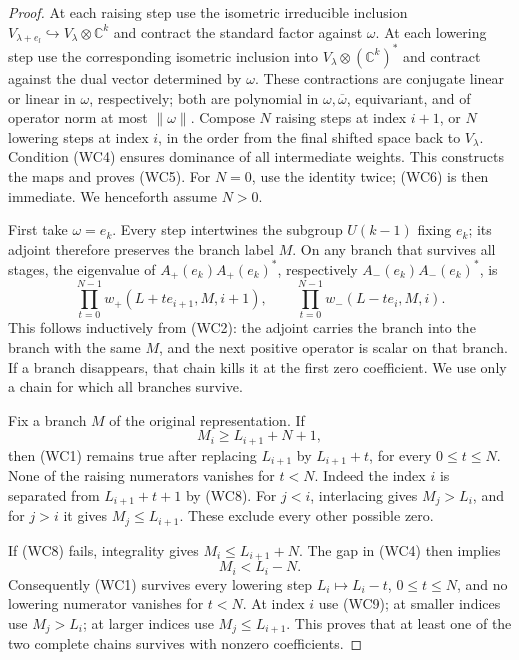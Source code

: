 \begin{proof}
At each raising step use the isometric irreducible inclusion
\(V_{\lambda+e_l}\hookrightarrow V_\lambda\otimes\mathbb C^k\)
and contract the standard factor against \(\omega\). At each
lowering step use the corresponding isometric inclusion into
\(V_\lambda\otimes(\mathbb C^k)^*\) and contract against the
dual vector determined by \(\omega\). These contractions are
conjugate linear or linear in \(\omega\), respectively; both are
polynomial in \(\omega,\overline\omega\), equivariant, and of
operator norm at most \(\|\omega\|\).
Compose \(N\) raising steps at index \(i+1\), or \(N\) lowering
steps at index \(i\), in the order from the final shifted space
back to \(V_\lambda\). Condition (WC4) ensures dominance of all
intermediate weights. This constructs the maps and proves (WC5).
For \(N=0\), use the identity twice; (WC6) is then immediate.
We henceforth assume \(N>0\).

First take \(\omega=e_k\). Every step intertwines the subgroup
\(U(k-1)\) fixing \(e_k\); its adjoint therefore preserves the
branch label \(M\). On any branch that survives all stages,
the eigenvalue of \(A_+(e_k)A_+(e_k)^*\), respectively
\(A_-(e_k)A_-(e_k)^*\), is
\[
 \prod_{t=0}^{N-1}w_+(L+te_{i+1},M,i+1),\qquad
 \prod_{t=0}^{N-1}w_-(L-te_i,M,i).                       \tag{WC7}
\]
This follows inductively from (WC2): the adjoint carries the
branch into the branch with the same \(M\), and the next positive
operator is scalar on that branch. If a branch disappears, that
chain kills it at the first zero coefficient. We use only a chain
for which all branches survive.

Fix a branch \(M\) of the original representation. If
\[
                        M_i\ge L_{i+1}+N+1,             \tag{WC8}
\]
then (WC1) remains true after replacing \(L_{i+1}\) by
\(L_{i+1}+t\), for every \(0\le t\le N\).
None of the raising numerators vanishes for \(t<N\).
Indeed the index \(i\) is separated from
\(L_{i+1}+t+1\) by (WC8). For \(j<i\), interlacing gives
\(M_j>L_i\), and for \(j>i\) it gives \(M_j\le L_{i+1}\).
These exclude every other possible zero.

If (WC8) fails, integrality gives
\(M_i\le L_{i+1}+N\). The gap in (WC4) then implies
\[
                       M_i<L_i-N .                     \tag{WC9}
\]
Consequently (WC1) survives every lowering step
\(L_i\mapsto L_i-t\), \(0\le t\le N\), and no lowering
numerator vanishes for \(t<N\). At index \(i\) use (WC9);
at smaller indices use \(M_j>L_i\); at larger indices use
\(M_j\le L_{i+1}\). This proves that at least one of the
two complete chains survives with nonzero coefficients.


\end{proof}
